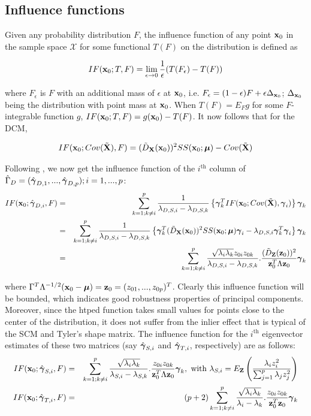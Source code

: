 \documentclass[fleqn,11pt]{article}
\begin{document}
\subsection{Influence functions}
Given any probability distribution $F$, the influence function of any point ${\bf{x}}_0$ in the sample space $\mathcal{X}$ for some functional $T(F)$ on the distribution is defined as

$$ IF({\bf{x}}_0; T,F) = \lim_{\epsilon \rightarrow 0} \frac{1}{\epsilon} (T(F_\epsilon) - T(F)) $$

where $F_\epsilon$ is $F$ with an additional mass of $\epsilon$ at ${\bf{x}}_0$, i.e. $F_\epsilon = (1-\epsilon)F + \epsilon \Delta_{{\bf{x}}_0}$; $\Delta_{{\bf{x}}_0}$ being the distribution with point mass at ${\bf{x}}_0$. When $T(F) = E_F g$ for some $F$-integrable function $g$, $IF({\bf{x}}_0; T,F) = g({\bf{x}}_0) - T(F)$. It now follows that for the DCM,

$$ IF({\bf{x}}_0; Cov(\tilde {{\mathbf{X}}}), F) = (\tilde D_{\mathbf{X}}({\bf{x}}_0))^2 SS({\bf{x}}_0; {\boldsymbol{\mu}}) - Cov(\tilde {{\mathbf{X}}}) $$

Following \cite{croux00}, we now get the influence function of the $i^\text{th}$ column of $\hat\Gamma_D = (\hat{{\boldsymbol{\gamma}}}_{D,1},...,\hat{{\boldsymbol{\gamma}}}_{D,p}); i = 1,...,p$:
\begin{eqnarray}
IF({\bf{x}}_0; \hat{{\boldsymbol{\gamma}}}_{D,i}, F) &=& \sum_{k=1; k \neq i}^p \frac{1}{\lambda_{D,S,i} - \lambda_{D,S,k}} \left\{ {\boldsymbol{\gamma}}^T_k IF({\bf{x}}_0; Cov(\tilde {{\mathbf{X}}}), {\boldsymbol{\gamma}}_i) \right\} {\boldsymbol{\gamma}}_k \notag \\
&=& \sum_{k=1; k \neq i}^p \frac{1}{\lambda_{D,S,i} - \lambda_{D,S,k}} \left\{ {\boldsymbol{\gamma}}^T_k (\tilde D_{\mathbf{X}}({\bf{x}}_0))^2 SS({\bf{x}}_0; {\boldsymbol{\mu}}){\boldsymbol{\gamma}}_i - \lambda_{D,S,i}{\boldsymbol{\gamma}}_k^T{\boldsymbol{\gamma}}_i \right\} {\boldsymbol{\gamma}}_k \notag \\
&=& \sum_{k=1; k \neq i}^p \frac{\sqrt{\lambda_i \lambda_k} z_{0i} z_{0k}}{\lambda_{D,S,i} - \lambda_{D,S,k}}. \frac{(\tilde D_{\mathbf{Z}}({\bf{z}}_0))^2 }{{\bf{z}}_0^T \Lambda {\bf{z}}_0} {\boldsymbol{\gamma}}_k
\end{eqnarray}

where $\Gamma^T \Lambda^{-1/2} ({\bf{x}}_0 - {\boldsymbol{\mu}}) = {\bf{z}}_0 = (z_{01},...,z_{0p})^T$. Clearly this influence function will be bounded, which indicates good robustness properties of principal components. Moreover, since the htped function takes small values for points close to the center of the distribution, it does not suffer from the inlier effect that is typical of the SCM and Tyler's shape matrix. The influence function for the $i^\text{th}$ eigenvector estimates of these two matrices (say $\hat{{\boldsymbol{\gamma}}}_{S,i}$ and $\hat{{\boldsymbol{\gamma}}}_{T,i}$, respectively) are as follows:
\begin{eqnarray*}
\quad IF({\bf{x}}_0; \hat {{\boldsymbol{\gamma}}}_{S,i}, F) &=& \sum_{k=1; k \neq i}^p \frac{\sqrt{\lambda_i \lambda_k}}{\lambda_{S,i} - \lambda_{S,k}}. \frac{z_{0i} z_{0k}}{{\bf{z}}_0^T \Lambda {\bf{z}}_0} {\boldsymbol{\gamma}}_k, \text{ with } \lambda_{S,i} = E_{\mathbf{Z}} \left( \frac{\lambda_i z_i^2}{\sum_{j=1}^p \lambda_j z_j^2} \right) \quad \\
IF({\bf{x}}_0; \hat {{\boldsymbol{\gamma}}}_{T,i}, F) &=& (p+2) \sum_{k=1; k \neq i}^p \frac{\sqrt{\lambda_i \lambda_k}}{\lambda_i - \lambda_k}. \frac{z_{0i} z_{0k}}{{\bf{z}}_0^T {\bf{z}}_0} {\boldsymbol{\gamma}}_k \quad 
\end{eqnarray*}
\end{document}
